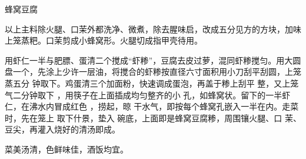 \begin{recipe}{蜂窝豆腐}

\ingredients


\cooking

\step 以上主料除火腿、口茉外都洗净、微煮，除去腥味启，改成五分见方的方块，加味
上笼蒸粑。口茉剪成小蜂窝形。火腿切成指甲壳待用。

\step 用虾仁一半与肥膘、蛋清二个搅成“虾糁”，豆腐去皮过萝，混同虾糁搅匀。用大圆
盘一个，先涂上少许一层油，将搅合的虾糁按直径六寸面积用小刀刮平刮圆，上笼蒸五分
钟取下。鸡蛋清三个加面粉，快速调成蛋泡，再盖于糁上刮平 整，又上笼气二分钟取下
，用筷子在上面插成均匀整齐的小 孔，如蜂窝状。留下的一半虾仁，在沸水内冒成红色
，捞起，晾 干水气，即按每个蜂窝孔嵌入一半在内。走菜时，先在笼上 取下什景，垫入
碗底，上面即是蜂窝豆腐糁，周围镶火腿、口 茉、豆尖，再灌入烧好的清汤即成。

\notes

菜美汤清，色鲜味佳，酒饭均宜。

\end{recipe}

